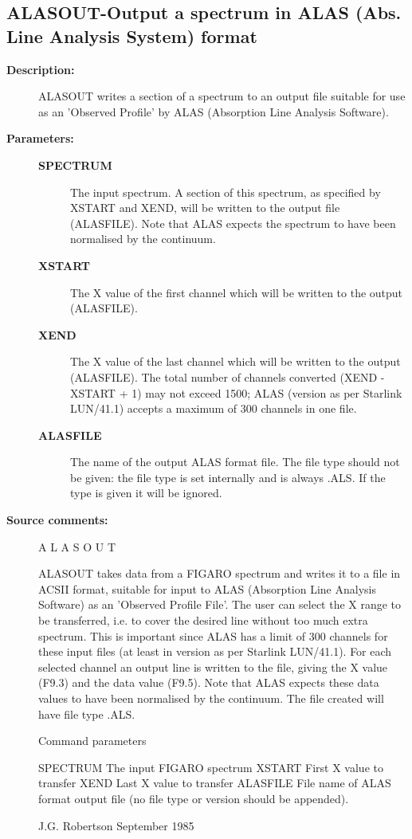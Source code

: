 \subsection{ALASOUT-\label{ALASOUT}Output a spectrum in ALAS (Abs. Line Analysis System) format}
\begin{description}

\item [\textbf{Description:}]
 ALASOUT  writes a section of a spectrum to an output file suitable for
 use as an 'Observed Profile' by ALAS (Absorption Line Analysis Software).

\item [\textbf{Parameters:}]
\begin{description}
\item [\textbf{SPECTRUM}]
 The input spectrum.  A section of this spectrum, as specified by XSTART
 and XEND, will be written to the output file (ALASFILE).  Note that ALAS
 expects the spectrum to have been normalised by the continuum.
\item [\textbf{XSTART}]
 The X value of the first channel which will be written to the output
 (ALASFILE).
\item [\textbf{XEND}]
 The X value of the last channel which will be written to the output
 (ALASFILE).  The total number of channels converted (XEND - XSTART + 1)
 may not exceed 1500; ALAS (version as per Starlink LUN/41.1) accepts a
 maximum of 300 channels in one file.
\item [\textbf{ALASFILE}]
 The name of the output ALAS format file.  The file type should not be
 given: the file type is set internally and is always .ALS.  If the type
 is given it will be ignored.
\end{description}

\item [\textbf{Source comments:}]
\begin{terminalv}
 A L A S O U T

 ALASOUT takes data from a FIGARO spectrum and writes it to a file
 in ACSII format, suitable for input to ALAS (Absorption Line
 Analysis Software) as an 'Observed Profile File'.
 The user can select the X range to be transferred, i.e. to cover
 the desired line without too much extra spectrum.  This is
 important since ALAS has a limit of 300 channels for these input
 files (at least in version as per Starlink LUN/41.1).
 For each selected channel an output line is written to the
 file, giving the X value (F9.3) and the data value (F9.5).
 Note that ALAS expects these data values to have been
 normalised by the continuum.
 The file created will have file type .ALS.

 Command parameters

 SPECTRUM    The input FIGARO spectrum
 XSTART      First X value to transfer
 XEND        Last X value to transfer
 ALASFILE    File name of ALAS format output file (no file type
             or version should be appended).

                            J.G. Robertson   September 1985
\end{terminalv}
\end{description}
